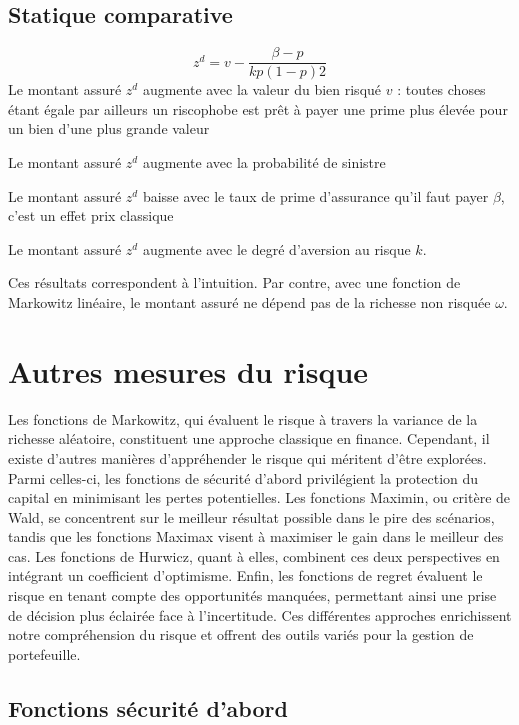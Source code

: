 \documentclass[a4paper, 12pt]{report}
\begin{document}
\subsection{Statique comparative}
$$
z^d=v-\frac{\beta-p}{kp(1-p)2}
$$
Le montant assuré $z^d$ augmente avec la valeur du bien risqué $v$ : toutes choses étant égale par ailleurs un riscophobe est prêt à payer une prime plus élevée pour un bien d'une plus grande valeur

Le montant assuré $z^d$ augmente avec la probabilité de sinistre

Le montant assuré $z^d$ baisse avec le taux de prime d'assurance qu'il faut payer $\beta$, c'est un effet prix classique

Le montant assuré $z^d$ augmente avec le degré d'aversion au risque $k$.

Ces résultats correspondent à l'intuition. Par contre, avec une fonction de Markowitz linéaire, le montant assuré ne dépend pas de la richesse non risquée $\omega$.

\section{Autres mesures du risque}

Les fonctions de Markowitz, qui évaluent le risque à travers la variance de la richesse aléatoire, constituent une approche classique en finance. Cependant, il existe d'autres manières d'appréhender le risque qui méritent d'être explorées. Parmi celles-ci, les fonctions de sécurité d'abord privilégient la protection du capital en minimisant les pertes potentielles. Les fonctions Maximin, ou critère de Wald, se concentrent sur le meilleur résultat possible dans le pire des scénarios, tandis que les fonctions Maximax visent à maximiser le gain dans le meilleur des cas. Les fonctions de Hurwicz, quant à elles, combinent ces deux perspectives en intégrant un coefficient d'optimisme. Enfin, les fonctions de regret évaluent le risque en tenant compte des opportunités manquées, permettant ainsi une prise de décision plus éclairée face à l'incertitude. Ces différentes approches enrichissent notre compréhension du risque et offrent des outils variés pour la gestion de portefeuille.

\subsection{Fonctions sécurité d'abord}
\end{document}
